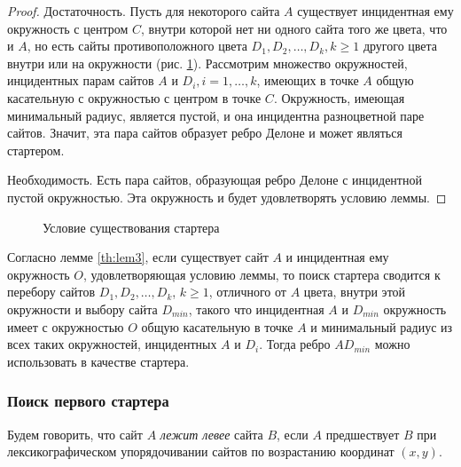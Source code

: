 \documentclass[12pt]{article}
\begin{document}
\begin{proof}
Достаточность. Пусть для некоторого сайта $A$ существует инцидентная ему окружность с центром $C$,
внутри которой нет ни одного сайта того же цвета, что и $A$,
но есть сайты противоположного цвета $D_1, D_2, \ldots, D_k, k \ge 1$ другого цвета внутри или на окружности (рис. \ref{pic:lem3}).
Рассмотрим множество окружностей, инцидентных парам сайтов $A$ и $D_i, i = 1, \ldots, k$,
имеющих в точке $A$ общую касательную с окружностью с центром в точке $C$.
Окружность, имеющая минимальный радиус, является пустой, и она инцидентна разноцветной паре сайтов.
Значит, эта пара сайтов образует ребро Делоне и может являться стартером.

Необходимость. Есть пара сайтов, образующая ребро Делоне с инцидентной пустой окружностью.
Эта окружность и будет удовлетворять условию леммы.
\end{proof}

\begin{figure}[htb!]
	\caption{Условие существования стартера}
	\label{pic:lem3}
\end{figure}

Согласно лемме \ref{th:lem3}, если существует сайт $A$ и инцидентная ему окружность $O$, удовлетворяющая условию леммы,
то поиск стартера сводится к перебору сайтов $D_1, D_2, \ldots, D_k$, $k \ge 1$, отличного от $A$ цвета,
внутри этой окружности и выбору сайта $D_{min}$,
такого что инцидентная $A$ и $D_{min}$ окружность имеет с окружностью $O$ общую касательную в точке $A$ и
минимальный радиус из всех таких окружностей, инцидентных $A$ и $D_i$.
Тогда ребро $AD_{min}$ можно использовать в качестве стартера.

\subsubsection{Поиск первого стартера}
Будем говорить, что сайт $A$ {\itshape лежит левее} сайта $B$,
если $A$ предшествует $B$ при лексикографическом упорядочивании сайтов по возрастанию координат $(x, y)$.
\end{document}
